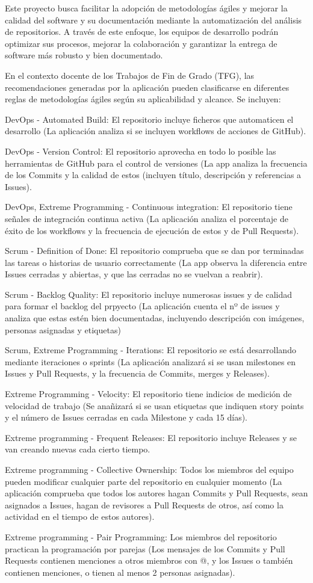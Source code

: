 Este proyecto busca facilitar la adopción de metodologías ágiles y mejorar la calidad del software y su documentación mediante la automatización del análisis de repositorios. A través de este enfoque, los equipos de desarrollo podrán optimizar sus procesos, mejorar la colaboración y garantizar la entrega de software más robusto y bien documentado.

En el contexto docente de los Trabajos de Fin de Grado (TFG), las recomendaciones generadas por la aplicación pueden clasificarse en diferentes reglas de metodologías ágiles según su aplicabilidad y alcance. Se incluyen:

DevOps - Automated Build: El repositorio incluye ficheros que automaticen el desarrollo (La aplicación analiza si se incluyen workflows de acciones de GitHub).

DevOps - Version Control: El repositorio aprovecha en todo lo posible las herramientas de GitHub para el control de versiones (La app analiza la frecuencia de los Commits y la calidad de estos (incluyen título, descripción y referencias a Issues).

DevOps, Extreme Programming - Continuous integration: El repositorio tiene señales de integración continua activa (La aplicación analiza el porcentaje de éxito de los workflows y la frecuencia de ejecución de estos y de Pull Requests).

Scrum - Definition of Done: El repositorio comprueba que se dan por terminadas las tareas o historias de usuario correctamente (La app observa la diferencia entre Issues cerradas y abiertas, y que las cerradas no se vuelvan a reabrir).

Scrum - Backlog Quality: El repositorio incluye numerosas issues y de calidad para formar el backlog del prpyecto (La aplicación cuenta el nº de issues y analiza que estas estén bien documentadas, incluyendo descripción con imágenes, personas asignadas y etiquetas)

Scrum, Extreme Programming - Iterations: El repositorio se está desarrollando mediante iteraciones o sprints (La aplicación analizará si se usan milestones en Issues y Pull Requests, y la frecuencia de Commits, merges y Releases).

Extreme Programming - Velocity: El repositorio tiene indicios de medición de velocidad de trabajo (Se anañizará si se usan etiquetas que indiquen story points y el número de Issues cerradas en cada Milestone y cada 15 días).

Extreme programming - Frequent Releases: El repositorio incluye Releases y se van creando nuevas cada cierto tiempo.

Extreme programming - Collective Ownership: Todos los miembros del equipo pueden modificar cualquier parte del repositorio en cualquier momento (La aplicación comprueba que todos los autores hagan Commits y Pull Requests, sean asignados a Issues, hagan de revisores a Pull Requests de otros, así como la actividad en el tiempo de estos autores).

Extreme programming - Pair Programming: Los miembros del repositorio practican la programación por parejas (Los mensajes de los Commits y Pull Requests contienen menciones a otros miembros con @, y los Issues o también contienen menciones, o tienen al menos 2 personas asignadas).